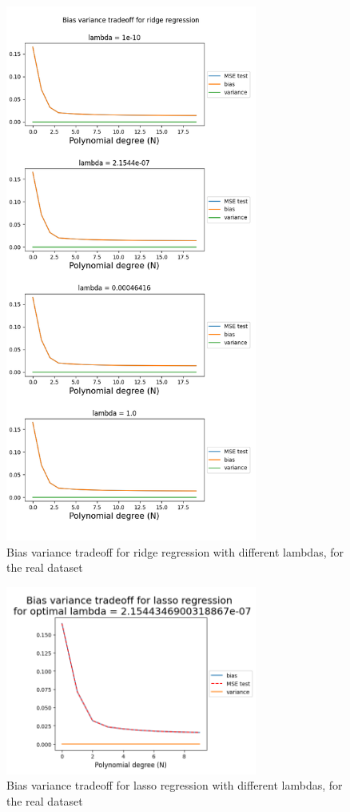 \documentclass[twocolumn,10pt,cleanfoot]{asme2ej}
\begin{document}
\begin{figure} 
\centerline{\includegraphics[width=3.25in]{figure/real1ridgedifflambdas.png}}
\caption{Bias variance tradeoff for ridge regression with different lambdas, for the real dataset}
\label{real1ridgedifflambdas}
\end{figure}

\begin{figure} 
\centerline{\includegraphics[width=3.25in]{figure/real1lassobiasvariance.png}}
\caption{Bias variance tradeoff for lasso regression with different lambdas, for the real dataset}
\label{real1lassobiasvariance}
\end{figure}
\end{document}
